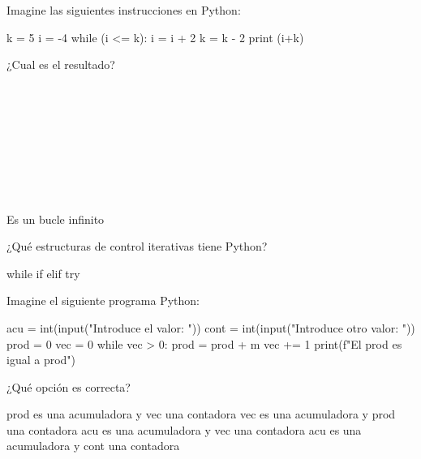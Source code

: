 \begin{ejercicio}Imagine las siguientes instrucciones en Python:


\begin{python}
k = 5
i = -4
while (i <= k):
    i = i + 2
    k = k - 2
    print (i+k)
\end{python}

¿Cual es el resultado?

\begin{choices}
    \choice %
\\
\\
    \choice 
{}\\
\\
\\
\\
    \choice 
{}\\
\\
    \choice Es un bucle infinito

\end{choices}



\end{ejercicio} 

\begin{ejercicio}¿Qué estructuras de control iterativas tiene Python? 

\begin{choices}
    \choice while %
    \choice if
    \choice elif
    \choice try
\end{choices}


\end{ejercicio} 

\begin{ejercicio}Imagine el siguiente programa Python:

\begin{python}
acu = int(input("Introduce el valor: "))
cont = int(input("Introduce otro valor: "))
prod = 0
vec = 0
while vec > 0: 
    prod = prod + m
    vec += 1 
print(f"El prod es igual a {prod}")
\end{python}

¿Qué opción es correcta?



\begin{choices}
    \choice prod es una acumuladora y vec una contadora %
    \choice vec es una acumuladora y prod una contadora
    \choice acu es una acumuladora y vec una contadora
    \choice acu es una acumuladora y cont una contadora
\end{choices}
\end{ejercicio}  



